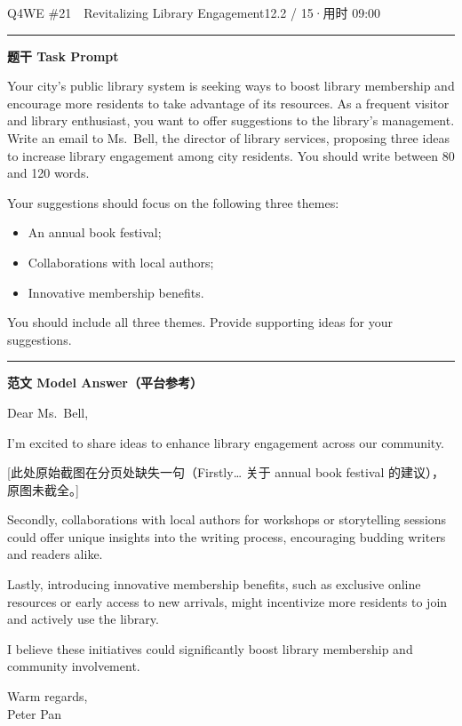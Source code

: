 \documentclass[11pt]{article}
\newcommand{\ptesub}[1]{%
  \par\needspace{2\baselineskip}\smallskip
  {\color{cAccent}\rule[-0.2ex]{3pt}{1.05em}}\hspace{6pt}%
  {\bfseries\color{cHead}#1}\par\nopagebreak\smallskip}
\begin{document}
\begin{qblock}{Q4\quad WE \#21\ \ Revitalizing Library Engagement}{12.2 / 15\quad·\quad 用时 09:00}

\ptesub{题干 Task Prompt}
\begin{promptbox}
Your city's public library system is seeking ways to boost library membership and encourage more residents to take advantage of its resources. As a frequent visitor and library enthusiast, you want to offer suggestions to the library's management. Write an email to Ms.\ Bell, the director of library services, proposing three ideas to increase library engagement among city residents. You should write between 80 and 120 words.

\smallskip Your suggestions should focus on the following three themes:
\begin{itemize}[leftmargin=1.4em,topsep=2pt,itemsep=0pt]
  \item An annual book festival;
  \item Collaborations with local authors;
  \item Innovative membership benefits.
\end{itemize}
You should include all three themes. Provide supporting ideas for your suggestions.
\end{promptbox}

\ptesub{范文 Model Answer（平台参考）}
\begin{modelbox}
Dear Ms.\ Bell,

I'm excited to share ideas to enhance library engagement across our community.

{\color{cWrong}\footnotesize[此处原始截图在分页处缺失一句（Firstly… 关于 annual book festival 的建议），原图未截全。]}

Secondly, collaborations with local authors for workshops or storytelling sessions could offer unique insights into the writing process, encouraging budding writers and readers alike.

Lastly, introducing innovative membership benefits, such as exclusive online resources or early access to new arrivals, might incentivize more residents to join and actively use the library.

I believe these initiatives could significantly boost library membership and community involvement.

Warm regards,\\ Peter Pan
\end{modelbox}


\end{qblock}
\end{document}
